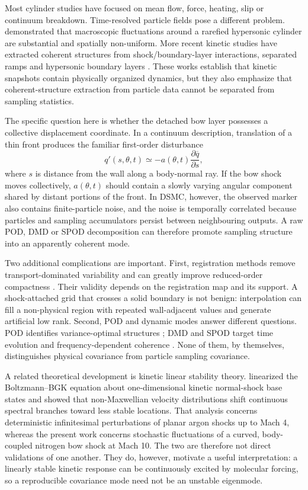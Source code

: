 \documentclass[paper]{JFM-FLM_Au}
\newcommand{\mean}[1]{\overline{#1}}
\begin{document}
Most cylinder studies have focused on mean flow, force, heating, slip or continuum breakdown. Time-resolved particle fields pose a different problem. \citet{Stefanov2000} demonstrated that macroscopic fluctuations around a rarefied hypersonic cylinder are substantial and spatially non-uniform. More recent kinetic studies have extracted coherent structures from shock/boundary-layer interactions, separated ramps and hypersonic boundary layers \citep{Sawant2021,Karpuzcu2025,Klothakis2021}. These works establish that kinetic snapshots contain physically organized dynamics, but they also emphasize that coherent-structure extraction from particle data cannot be separated from sampling statistics.

The specific question here is whether the detached bow layer possesses a collective displacement coordinate. In a continuum description, translation of a thin front produces the familiar first-order disturbance
\begin{equation}
 q'(s,\theta,t)\simeq-a(\theta,t)\frac{\partial \mean q}{\partial s},
 \label{eq:translation}
\end{equation}
where $s$ is distance from the wall along a body-normal ray. If the bow shock moves collectively, $a(\theta,t)$ should contain a slowly varying angular component shared by distant portions of the front. In DSMC, however, the observed marker also contains finite-particle noise, and the noise is temporally correlated because particles and sampling accumulators persist between neighbouring outputs. A raw POD, DMD or SPOD decomposition can therefore promote sampling structure into an apparently coherent mode.

Two additional complications are important. First, registration methods remove transport-dominated variability and can greatly improve reduced-order compactness \citep{RowleyMarsden2000,Reiss2018,Taddei2020}. Their validity depends on the registration map and its support. A shock-attached grid that crosses a solid boundary is not benign: interpolation can fill a non-physical region with repeated wall-adjacent values and generate artificial low rank. Second, POD and dynamic modes answer different questions. POD identifies variance-optimal structures \citep{Lumley1967,Sirovich1987,Berkooz1993,Taira2017}; DMD and SPOD target time evolution and frequency-dependent coherence \citep{Schmid2010,Towne2018}. None of them, by themselves, distinguishes physical covariance from particle sampling covariance.

A related theoretical development is kinetic linear stability theory. \citet{Karpuzcu2026} linearized the Boltzmann--BGK equation about one-dimensional kinetic normal-shock base states and showed that non-Maxwellian velocity distributions shift continuous spectral branches toward less stable locations. That analysis concerns deterministic infinitesimal perturbations of planar argon shocks up to Mach 4, whereas the present work concerns stochastic fluctuations of a curved, body-coupled nitrogen bow shock at Mach 10. The two are therefore not direct validations of one another. They do, however, motivate a useful interpretation: a linearly stable kinetic response can be continuously excited by molecular forcing, so a reproducible covariance mode need not be an unstable eigenmode.
\end{document}
